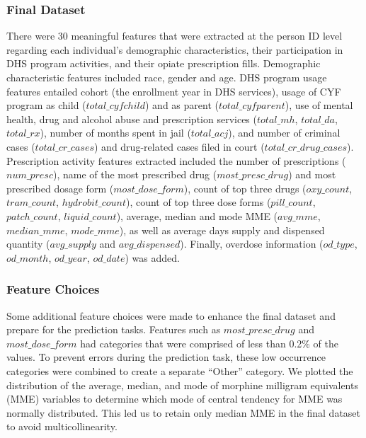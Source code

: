 \documentclass[twoside,10.5pt]{article}
\begin{document}
\subsubsection{Final Dataset}
There were 30 meaningful features that were extracted at the person ID level regarding each individual's demographic characteristics, their participation in DHS program activities, and their opiate prescription fills. Demographic characteristic features included race, gender and age. DHS program usage features entailed cohort (the enrollment year in DHS services), usage of CYF program as child ($total\_cyfchild$) and as parent ($total\_cyfparent$), use of mental health, drug and alcohol abuse and prescription services ($total\_mh$, $total\_da$, $total\_rx$), number of months spent in jail ($total\_acj$), and number of criminal cases ($total\_cr\_cases$) and drug-related cases filed in court ($total\_cr\_drug\_cases$). \\

Prescription activity features extracted included the number of prescriptions ($num\_presc$), name of the most prescribed drug ($most\_presc\_drug$) and most prescribed dosage form ($most\_dose\_form$), count of top three drugs ($oxy\_count$, $tram\_count$, $hydrobit\_count$), count of top three dose forms ($pill\_count$, $patch\_count$, $liquid\_count$), average, median and mode MME ($avg\_mme$, $median\_mme$, $mode\_mme$), as well as average days supply and dispensed quantity ($avg\_supply$ and $avg\_dispensed$). Finally, overdose information ($od\_type$, $od\_month$, $od\_year$, $od\_date$) was added. 

\subsubsection{Feature Choices}
Some additional feature choices were made to enhance the final dataset and prepare for the prediction tasks. Features such as $most\_presc\_drug$ and $most\_dose\_form$ had categories that were comprised of less than 0.2\% of the values. To prevent errors during the prediction task, these low occurrence categories were combined to create a separate “Other” category. We plotted the distribution of the average, median, and mode of morphine milligram equivalents (MME) variables to determine which mode of central tendency for MME was normally distributed. This led us to retain only median MME in the final dataset to avoid multicollinearity.\\
\end{document}
